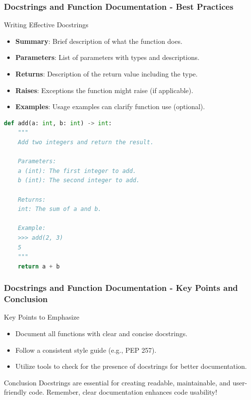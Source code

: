\documentclass{beamer}
\begin{document}
\begin{frame}[fragile]
    \frametitle{Docstrings and Function Documentation - Best Practices}
    \begin{block}{Writing Effective Docstrings}
        \begin{itemize}
            \item \textbf{Summary}: Brief description of what the function does.
            \item \textbf{Parameters}: List of parameters with types and descriptions.
            \item \textbf{Returns}: Description of the return value including the type.
            \item \textbf{Raises}: Exceptions the function might raise (if applicable).
            \item \textbf{Examples}: Usage examples can clarify function use (optional).
        \end{itemize}

        \begin{lstlisting}[language=Python]
def add(a: int, b: int) -> int:
    """
    Add two integers and return the result.
    
    Parameters:
    a (int): The first integer to add.
    b (int): The second integer to add.
    
    Returns:
    int: The sum of a and b.

    Example:
    >>> add(2, 3)
    5
    """
    return a + b
        \end{lstlisting}
    \end{block}
\end{frame}

\begin{frame}[fragile]
    \frametitle{Docstrings and Function Documentation - Key Points and Conclusion}
    \begin{block}{Key Points to Emphasize}
        \begin{itemize}
            \item Document all functions with clear and concise docstrings.
            \item Follow a consistent style guide (e.g., PEP 257).
            \item Utilize tools to check for the presence of docstrings for better documentation.
        \end{itemize}
    \end{block}
    
    \begin{block}{Conclusion}
        Docstrings are essential for creating readable, maintainable, and user-friendly code. Remember, clear documentation enhances code usability!
    \end{block}
\end{frame}
\end{document}
